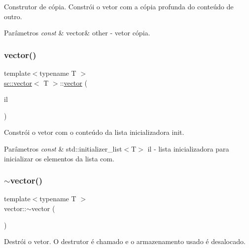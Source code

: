 Construtor de cópia. Constrói o vetor com a cópia profunda do conteúdo de outro. 
\begin{DoxyParams}{Parâmetros}
{\em const} & vector\& other -\/ vetor cópia. \\
\hline
\end{DoxyParams}
\mbox{\label{classsc_1_1vector_afabfa0d0a4c92d9b8d358821de73de3f}} 
\subsubsection{\texorpdfstring{vector()}{vector()}\hspace{0.1cm}{\footnotesize\ttfamily [5/11]}}
{\footnotesize\ttfamily template$<$typename T $>$ \\
\mbox{\hyperlink{classsc_1_1vector}{sc\+::vector}}$<$ T $>$\+::\mbox{\hyperlink{classsc_1_1vector}{vector}} (\begin{DoxyParamCaption}\item[{const std\+::initializer\+\_\+list$<$ T $>$}]{il }\end{DoxyParamCaption})}

Constrói o vetor com o conteúdo da lista inicializadora init. 
\begin{DoxyParams}{Parâmetros}
{\em const} & std\+::initializer\+\_\+list$<$\+T$>$ il -\/ lista inicializadora para inicializar os elementos da lista com. \\
\hline
\end{DoxyParams}
\mbox{\label{classsc_1_1vector_a2360fd6b0e63319e12d30ebc4c8330ab}} 
\subsubsection{\texorpdfstring{$\sim$vector()}{~vector()}}
{\footnotesize\ttfamily template$<$typename T $>$ \\
vector\+::$\sim$vector (\begin{DoxyParamCaption}\item[{void}]{ }\end{DoxyParamCaption})\hspace{0.3cm}{\ttfamily [default]}}

Destrói o vetor. O destrutor é chamado e o armazenamento usado é desalocado. \mbox{\label{classsc_1_1vector_a09edcd127164af330873721038aa4ccc}} 
